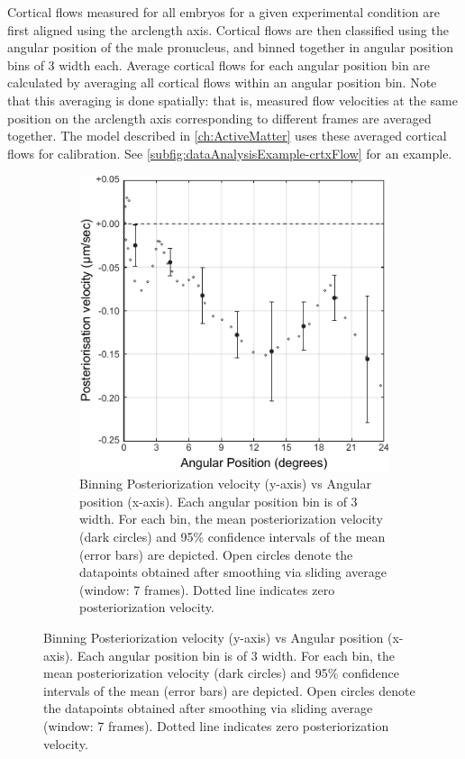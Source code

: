Cortical flows measured for all embryos for a given experimental condition are first aligned using the arclength axis. Cortical flows are then classified using the angular position of the male pronucleus, and binned together in angular position bins of \SI{3}{\unitAngle} width each. Average cortical flows for each angular position bin are calculated by averaging all cortical flows within an angular position bin. Note that this averaging is done spatially: that is, measured flow velocities at the same position on the arclength axis corresponding to different frames are averaged together. The model described in \autoref{ch:ActiveMatter} uses these averaged cortical flows for calibration. See \autoref{subfig:dataAnalysisExample-crtxFlow} for an example.

\begin{figure}[h]
\centering
\begin{subfigure}[t]{0.45\textwidth}
    \centering
    \includegraphics[width=\textwidth]{ExpMethods/FigDataAnalysis/postVel.pdf}
    \caption{Binning Posteriorization velocity (y-axis) vs Angular position (x-axis). Each angular position bin is of \SI{3}{\unitAngle} width. For each bin, the mean posteriorization velocity (dark circles) and 95\% confidence intervals of the mean (error bars) are depicted. Open circles denote the datapoints obtained after smoothing via sliding average (window: \num{7} frames). Dotted line indicates zero posteriorization velocity.} 

\end{subfigure}
\end{figure}
